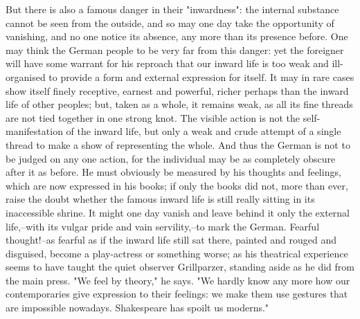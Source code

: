 But there is also a famous danger in their "inwardness": the internal
substance cannot be seen from the outside, and so may one day take
the opportunity of vanishing, and no one notice its absence, any more
than its presence before. One may think the German people to be very
far from this danger: yet the foreigner will have some warrant for
his reproach that our inward life is too weak and ill-organised to
provide a form and external expression for itself. It may in rare
cases show itself finely receptive, earnest and powerful, richer
perhaps than the inward life of other peoples; but, taken as a whole,
it remains weak, as all its fine threads are not tied together in one
strong knot. The visible action is not the self-manifestation of the
inward life, but only a weak and crude attempt of a single thread to
make a show of representing the whole. And thus the German is not to
be judged on any one action, for the individual may be as completely
obscure after it as before. He must obviously be measured by his
thoughts and feelings, which are now expressed in his books; if only
the books did not, more than ever, raise the doubt whether the famous
inward life is still really sitting in its inaccessible shrine. It
might one day vanish and leave behind it only the external
life,--with its vulgar pride and vain servility,--to mark the German.
Fearful thought!--as fearful as if the inward life still sat there,
painted and rouged and disguised, become a play-actress or something
worse; as his theatrical experience seems to have taught the quiet
observer Grillparzer, standing aside as he did from the main press.
"We feel by theory," he says. "We hardly know any more how our
contemporaries give expression to their feelings: we make them use
gestures that are impossible nowadays. Shakespeare has spoilt us
moderns."


